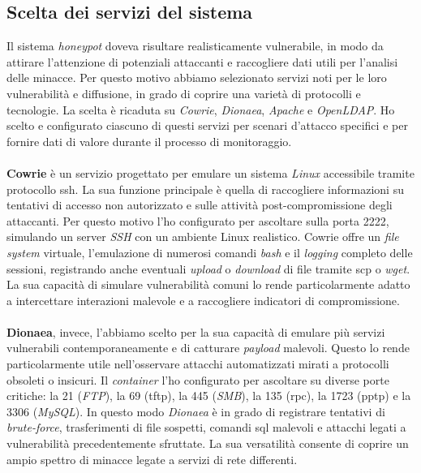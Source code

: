 \subsection{Scelta dei servizi del sistema}
Il sistema \textit{honeypot} doveva risultare realisticamente vulnerabile, in modo da attirare l'attenzione di potenziali attaccanti e raccogliere dati utili per l'analisi delle minacce. 
Per questo motivo abbiamo selezionato servizi noti per le loro vulnerabilità e diffusione, in grado di coprire una varietà di protocolli e tecnologie. 
La scelta è ricaduta su \textit{Cowrie}, \textit{Dionaea}, \textit{Apache} e \textit{OpenLDAP}. Ho scelto e configurato ciascuno di questi servizi per scenari d'attacco specifici e per fornire dati di valore durante il processo di monitoraggio.\\\\
\textbf{Cowrie} è un servizio progettato per emulare un sistema \textit{Linux} accessibile tramite protocollo \gls{ssh}. La sua funzione principale è quella di raccogliere informazioni su tentativi di accesso non autorizzato e sulle attività post-compromissione degli attaccanti. 
Per questo motivo l'ho configurato per ascoltare sulla porta 2222, simulando un server \textit{SSH} con un ambiente Linux realistico. 
Cowrie offre un \textit{file system} virtuale, l'emulazione di numerosi comandi \textit{bash} e il \textit{logging} completo delle sessioni, registrando anche eventuali \textit{upload} o \textit{download} di file tramite \gls{scp} o \textit{wget}. 
La sua capacità di simulare vulnerabilità comuni lo rende particolarmente adatto a intercettare interazioni malevole e a raccogliere indicatori di compromissione.\\\\
\textbf{Dionaea}, invece, l'abbiamo scelto per la sua capacità di emulare più servizi vulnerabili contemporaneamente e di catturare \textit{payload} malevoli. 
Questo lo rende particolarmente utile nell'osservare attacchi automatizzati mirati a protocolli obsoleti o insicuri. 
Il \textit{container} l'ho configurato per ascoltare su diverse porte critiche: la 21 (\textit{FTP}), la 69 (\gls{tftp}), la 445 (\textit{SMB}), la 135 (\gls{rpc}), la 1723 (\gls{pptp}) e la 3306 (\textit{MySQL}). 
In questo modo \textit{Dionaea} è in grado di registrare tentativi di \textit{brute-force}, trasferimenti di file sospetti, comandi \gls{sql} malevoli e attacchi legati a vulnerabilità precedentemente sfruttate. 
La sua versatilità consente di coprire un ampio spettro di minacce legate a servizi di rete differenti.\\\\
